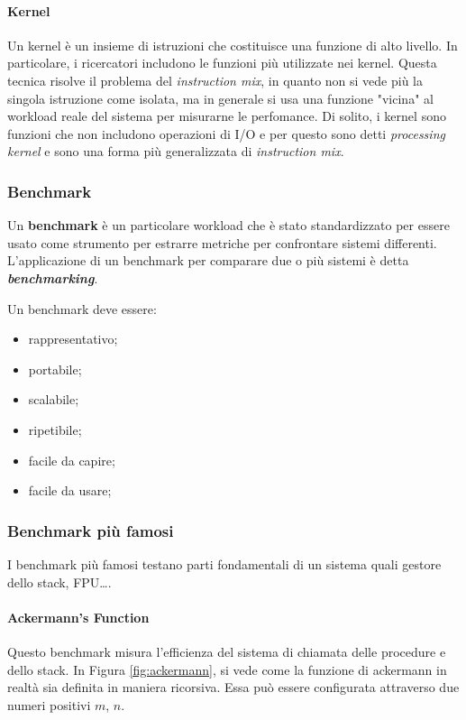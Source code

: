 \documentclass{article}
\begin{document}
\paragraph{Kernel} Un kernel è un insieme di istruzioni che costituisce una funzione di alto
livello. In particolare, i ricercatori includono le funzioni più utilizzate nei kernel.
Questa tecnica risolve il problema del \textit{instruction mix}, in quanto non si vede più
la singola istruzione come isolata, ma in generale si usa una funzione "vicina" al workload
reale del sistema per misurarne le perfomance. Di solito, i kernel sono funzioni che non 
includono operazioni di I/O e per questo sono detti \textit{processing kernel} e sono una 
forma più generalizzata di \textit{instruction mix}. 

\subsubsection{Benchmark}
Un \textbf{benchmark} è un particolare workload che è stato standardizzato per essere usato
come strumento per estrarre metriche per confrontare sistemi differenti. L'applicazione di
un benchmark per comparare due o più sistemi è detta \textbf{\textit{benchmarking}}.

Un benchmark deve essere:
\begin{itemize}
  \item rappresentativo;
  \item portabile;
  \item scalabile;
  \item ripetibile;
  \item facile da capire;
  \item facile da usare;
\end{itemize}

\subsubsection{Benchmark più famosi}
I benchmark più famosi testano parti fondamentali di un sistema quali gestore dello stack,
FPU\dots.

\paragraph{Ackermann's Function}
Questo benchmark misura l'efficienza del sistema di chiamata delle procedure e dello stack.
In Figura \ref{fig:ackermann}, si vede come la funzione di ackermann in realtà sia definita 
in maniera ricorsiva. Essa può essere configurata attraverso due numeri positivi $m$, $n$.
\end{document}
